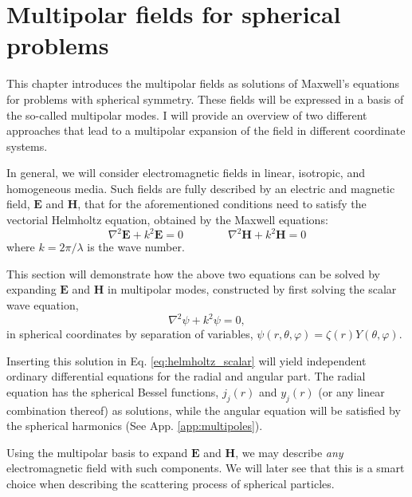 \section{Multipolar fields for spherical problems}\label{sec:2}

This chapter introduces the multipolar fields as solutions of Maxwell's equations for problems with spherical symmetry. These fields will be expressed in a basis of the so-called multipolar modes. I will provide an overview of two different approaches that lead to a multipolar expansion of the field in different coordinate systems.

In general, we will consider electromagnetic fields in linear, isotropic, and homogeneous media. Such fields are fully described by an electric and magnetic field, \( \mathbf{E} \) and \( \mathbf{H} \), that for the aforementioned conditions need to satisfy the vectorial Helmholtz equation, obtained by the Maxwell equations:
\begin{equation}
    \label{eq:helmholtz}
    \nabla^2\mathbf{E} + k^2\mathbf{E} = 0 \qquad \qquad \nabla^2\mathbf{H} + k^2\mathbf{H} = 0
\end{equation}
where \( k = 2\pi / \lambda \) is the wave number.

This section will demonstrate how the above two equations can be solved by expanding \( \mathbf{E} \) and \( \mathbf{H} \) in multipolar modes, constructed by first solving the scalar wave equation,
\begin{equation}\label{eq:helmholtz_scalar}
    \nabla^2 \psi + k^2 \psi = 0,
\end{equation}
in spherical coordinates by separation of variables, \( \psi(r, \theta, \varphi) = \zeta(r) Y(\theta, \varphi) \).

Inserting this solution in Eq. \ref{eq:helmholtz_scalar} will yield independent ordinary differential equations for the radial and angular part. The radial equation has the spherical Bessel functions, \( j_j(r) \) and \( y_j(r) \) (or any linear combination thereof) as solutions, while the angular equation will be satisfied by the spherical harmonics (See App. \ref{app:multipoles}).

Using the multipolar basis to expand \( \mathbf{E} \) and \( \mathbf{H} \), we may describe \textit{any} electromagnetic field with such components. We will later see that this is a smart choice when describing the scattering process of spherical particles.

